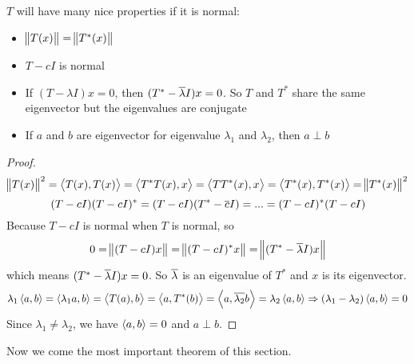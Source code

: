 \begin{theorem}
    $T$ will have many nice properties if it is normal:
\begin{itemize}
    \item $\norm{T(x)} = \norm{T^* (x)}$
    \item $T - cI$ is normal
    \item If $(T - \lambda I)x = 0$, then $(T^* - \overline{\lambda}I)x = 0$. So $T$ and $T^*$ share the same eigenvector but the eigenvalues are conjugate
    \item If $a$ and $b$ are eigenvector for eigenvalue $\lambda_1$ and $\lambda_2$, then $a \perp b$
\end{itemize}
\end{theorem}
\begin{proof}
    \begin{equation*}
        \norm{T(x)}^2 = \left\langle \displaystyle T(x), T(x) \right\rangle = \left\langle \displaystyle T^*T(x), x \right\rangle = \left\langle \displaystyle TT^*(x), x \right\rangle = \left\langle \displaystyle T^*(x), T^*(x) \right\rangle = \norm{T^*(x)}^2
    \end{equation*}
    \begin{equation*}
        (T-cI)(T-cI)^* = (T-cI)(T^* - \overline{c}I) = ... = (T-cI)^*(T-cI)
    \end{equation*}
    Because $T-cI$ is normal when $T$ is normal, so
    \begin{equation*}
        0 = \norm{(T-cI)x} = \norm{(T-cI)^* x} =  \norm{(T^*- \overline{\lambda} I)x}
    \end{equation*}
    which means $(T^*- \overline{\lambda} I)x = 0$. So $\overline{\lambda}$ is an eigenvalue of $T^*$ and $x$ is its eigenvector.
    \begin{equation*}
        \lambda_1 \left\langle \displaystyle a, b \right\rangle = \left\langle \displaystyle \lambda_1 a, b \right\rangle = \left\langle \displaystyle T(a), b \right\rangle = \left\langle \displaystyle a, T^*(b) \right\rangle = \left\langle \displaystyle a, \overline{\lambda_2}b \right\rangle = \lambda_2 \left\langle \displaystyle a, b \right\rangle \Rightarrow (\lambda_1 - \lambda_2)\left\langle \displaystyle a, b \right\rangle = 0
    \end{equation*}
    Since $\lambda_1 \neq \lambda_2$, we have $\left\langle \displaystyle a, b \right\rangle = 0$ and $a \perp b$.
\end{proof}



Now we come the most important theorem of this section.

